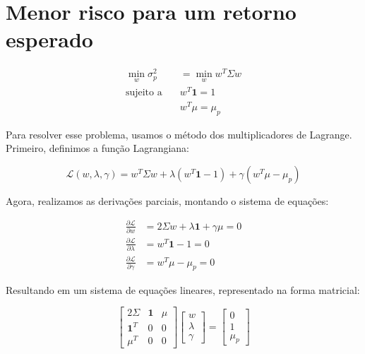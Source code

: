 \documentclass[a4paper,10pt]{article}
\begin{document}
\section*{Menor risco para um retorno esperado}

\begin{equation*}
    \begin{aligned}
        \min_{w} \sigma_{p}^{2} &= \min_{w} w^{T} \Sigma w \\
        \text{sujeito a} \quad & w^{T} \mathbf{1} = 1 \\
        & w^{T} \mu = \mu_{p}
    \end{aligned}
\end{equation*}

Para resolver esse problema, usamos o método dos multiplicadores de Lagrange. Primeiro, definimos a função Lagrangiana:

\begin{equation*}
    \mathcal{L}(w, \lambda, \gamma) = w^{T} \Sigma w + \lambda (w^{T} \mathbf{1} - 1) + \gamma (w^{T} \mu - \mu_{p})
\end{equation*}

Agora, realizamos as derivações parciais, montando o sistema de equações:

\begin{equation*}
    \begin{aligned}
        \frac{\partial \mathcal{L}}{\partial w} &= 2 \Sigma w + \lambda \mathbf{1} + \gamma \mu = 0 \\
        \frac{\partial \mathcal{L}}{\partial \lambda} &= w^{T} \mathbf{1} - 1 = 0 \\
        \frac{\partial \mathcal{L}}{\partial \gamma} &= w^{T} \mu - \mu_{p} = 0
    \end{aligned}
\end{equation*}

Resultando em um sistema de equações lineares, representado na forma matricial:

\begin{equation*}
    \begin{bmatrix}
        2 \Sigma & \mathbf{1} & \mu \\
        \mathbf{1}^{T} & 0 & 0 \\
        \mu^{T} & 0 & 0
    \end{bmatrix}
    \begin{bmatrix}
        w \\
        \lambda \\
        \gamma
    \end{bmatrix}
    =
    \begin{bmatrix}
        0 \\
        1 \\
        \mu_{p}
    \end{bmatrix}
\end{equation*}
\end{document}
